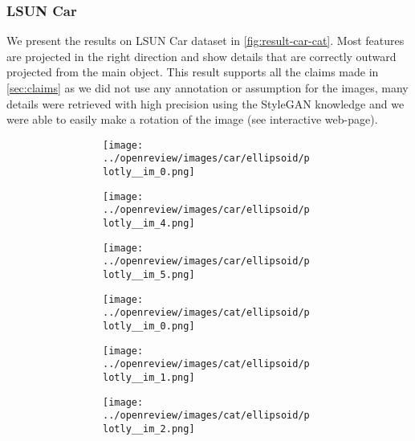 \subsubsection{LSUN Car}
We present the results on LSUN Car dataset in \autoref{fig:result-car-cat}. Most features are projected in the right direction and show details that are correctly outward projected from the main object. This result supports all the claims made in \autoref{sec:claims} as we did not use any annotation or assumption for the images, many details were retrieved with high precision using the StyleGAN knowledge and we were able to easily make a rotation of the image (see interactive web-page).
\begin{figure}[h]
    \centering
    \begin{subfigure}{0.80\textwidth}
        \begin{subfigure}{0.16\textwidth}
            \centering
            \texttt{[image: ../openreview/images/car/ellipsoid/plotly\_\_im\_0.png]}
        \end{subfigure}
        \begin{subfigure}{0.16\textwidth}
            \centering
            \texttt{[image: ../openreview/images/car/ellipsoid/plotly\_\_im\_4.png]}
        \end{subfigure}
        \begin{subfigure}{0.16\textwidth}
            \centering
            \texttt{[image: ../openreview/images/car/ellipsoid/plotly\_\_im\_5.png]}
        \end{subfigure}
        \begin{subfigure}{0.16\textwidth}
            \centering
            \texttt{[image: ../openreview/images/cat/ellipsoid/plotly\_\_im\_0.png]}
        \end{subfigure}
        \begin{subfigure}{0.16\textwidth}
            \centering
            \texttt{[image: ../openreview/images/cat/ellipsoid/plotly\_\_im\_1.png]}
        \end{subfigure}
        \begin{subfigure}{0.16\textwidth}
            \centering
            \texttt{[image: ../openreview/images/cat/ellipsoid/plotly\_\_im\_2.png]}
        \end{subfigure}
    

\end{subfigure}
\end{figure}
